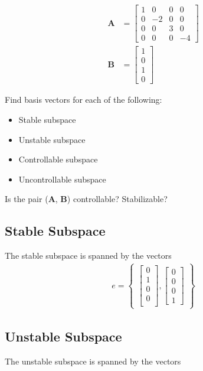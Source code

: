 \documentclass[]{article}
\begin{document}
\begin{align*}
	\mathbf{A} &= \begin{bmatrix}
	1 & 0 & 0 & 0 \\
	0 & -2 & 0 & 0 \\
	0 & 0 & 3 & 0 \\
	0 & 0 & 0 & -4
	\end{bmatrix} \\
	\mathbf{B} &= \begin{bmatrix}
	1 \\
	0 \\
	1 \\
	0
	\end{bmatrix}
\end{align*}

Find basis vectors for each of the following:
\begin{itemize}
	\item Stable subspace
	\item Unstable subspace
	\item Controllable subspace
	\item Uncontrollable subspace
\end{itemize}

Is the pair (\textbf{A}, \textbf{B}) controllable? Stabilizable?

\subsection{Stable Subspace}
The stable subspace is spanned by the vectors
\begin{align*}
	{e} = \begin{Bmatrix}
	\begin{bmatrix}
	0\\
	1\\
	0\\
	0\\
	\end{bmatrix}, \begin{bmatrix}
	0\\
	0\\
	0\\
	1
	\end{bmatrix}
	\end{Bmatrix}
\end{align*}

\subsection{Unstable Subspace}
The unstable subspace is spanned by the vectors 
\end{document}
